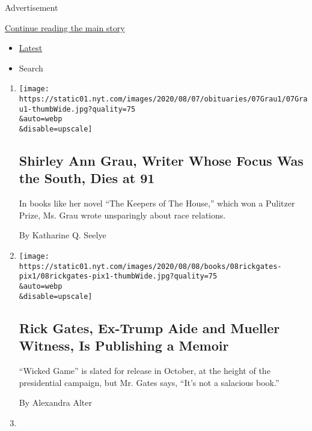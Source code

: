 Advertisement

\protect\hyperlink{after-mid1}{Continue reading the main story}

\begin{itemize}
\tightlist
\item
  \protect\hyperlink{stream-panel}{Latest}
\item
  Search
\end{itemize}

\begin{enumerate}
\def\labelenumi{\arabic{enumi}.}
\item
  \href{/2020/08/08/books/shirley-ann-grau-dead.html}{}

  \texttt{[image: https://static01.nyt.com/images/2020/08/07/obituaries/07Grau1/07Grau1-thumbWide.jpg?quality=75\\\&auto=webp\\\&disable=upscale]}

  \hypertarget{shirley-ann-grau-writer-whose-focus-was-the-south-dies-at-91}{%
  \subsection{Shirley Ann Grau, Writer Whose Focus Was the South, Dies
  at
  91}\label{shirley-ann-grau-writer-whose-focus-was-the-south-dies-at-91}}

  In books like her novel ``The Keepers of The House,'' which won a
  Pulitzer Prize, Ms. Grau wrote unsparingly about race relations.

  By Katharine Q. Seelye
\item
  \href{/2020/08/08/books/rick-gates-trump-mueller-wicked-game.html}{}

  \texttt{[image: https://static01.nyt.com/images/2020/08/08/books/08rickgates-pix1/08rickgates-pix1-thumbWide.jpg?quality=75\\\&auto=webp\\\&disable=upscale]}

  \hypertarget{rick-gates-ex-trump-aide-and-mueller-witness-is-publishing-a-memoir}{%
  \subsection{Rick Gates, Ex-Trump Aide and Mueller Witness, Is
  Publishing a
  Memoir}\label{rick-gates-ex-trump-aide-and-mueller-witness-is-publishing-a-memoir}}

  ``Wicked Game'' is slated for release in October, at the height of the
  presidential campaign, but Mr. Gates says, ``It's not a salacious
  book.''

  By Alexandra Alter
\item
  \href{/2020/08/08/theater/godspell-review-berkshires.html}{}


\end{enumerate}
